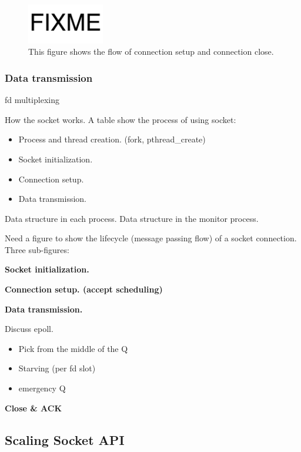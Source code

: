 \begin{figure}[t]
	\centering
	\includegraphics[width=0.3\textwidth]{images/fixme}
	\caption{This figure shows the flow of connection setup and connection close.}
	\label{fig:conn-setup-close}
\end{figure}

\label{subsubsec:connection_management}
\subsubsection{Data transmission}




\label{subsubsec:data_trans}
fd multiplexing

How the socket works. A table show the process of using socket:

\begin{itemize}
	\item Process and thread creation. (fork, pthread\_create)
	\item Socket initialization.
	\item Connection setup.
	\item Data transmission.
\end{itemize}


Data structure in each process. Data structure in the monitor process.

Need a figure to show the lifecycle (message passing flow) of a socket connection. Three sub-figures:


	 \textbf{Socket initialization.}
	  
	 \textbf{Connection setup. (accept scheduling)}
	 
	 \textbf{Data transmission.}
	 
	 Discuss epoll.
\begin{itemize}
	\item Pick from the middle of the Q
	\item Starving (per fd slot)
	\item emergency Q
\end{itemize}

    \textbf{Close \& ACK}


\subsection{Scaling Socket API}
\label{subsec:fork}

